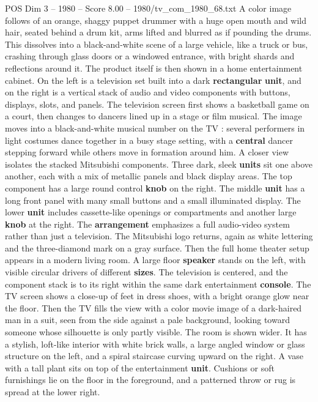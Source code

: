\begin{textsample}{POS Dim 3 – 1980 – Score 8.00 – 1980/tv\_com\_1980\_68.txt}
A color image follows of an orange, shaggy puppet drummer with a huge open mouth and wild hair, seated behind a drum kit, arms lifted and blurred as if pounding the drums.
This dissolves into a black-and-white scene of a large vehicle, like a truck or bus, crashing through glass doors or a windowed entrance, with bright shards and reflections around it.
The product itself is then shown in a home entertainment cabinet.
On the left is a television set built into a dark \textbf{rectangular} \textbf{unit}, and on the right is a vertical stack of audio and video components with buttons, displays, slots, and panels.
The television screen first shows a basketball game on a court, then changes to dancers lined up in a stage or film musical.
The image moves into a black-and-white musical number on the TV : several performers in light costumes dance together in a busy stage setting, with a \textbf{central} dancer stepping forward while others move in formation around him.
A closer view isolates the stacked Mitsubishi components.
Three dark, sleek \textbf{units} sit one above another, each with a mix of metallic panels and black display areas.
The top component has a large round control \textbf{knob} on the right.
The middle \textbf{unit} has a long front panel with many small buttons and a small illuminated display.
The lower \textbf{unit} includes cassette-like openings or compartments and another large \textbf{knob} at the right.
The \textbf{arrangement} emphasizes a full audio-video system rather than just a television.
The Mitsubishi logo returns, again as white lettering and the three-diamond mark on a gray surface.
Then the full home theater setup appears in a modern living room.
A large floor \textbf{speaker} stands on the left, with visible circular drivers of different \textbf{sizes}.
The television is centered, and the component stack is to its right within the same dark entertainment \textbf{console}.
The TV screen shows a close-up of feet in dress shoes, with a bright orange glow near the floor.
Then the TV fills the view with a color movie image of a dark-haired man in a suit, seen from the side against a pale background, looking toward someone whose silhouette is only partly visible.
The room is shown wider.
It has a stylish, loft-like interior with white brick walls, a large angled window or glass structure on the left, and a spiral staircase curving upward on the right.
A vase with a tall plant sits on top of the entertainment \textbf{unit}.
Cushions or soft furnishings lie on the floor in the foreground, and a patterned throw or rug is spread at the lower right.

\end{textsample}
